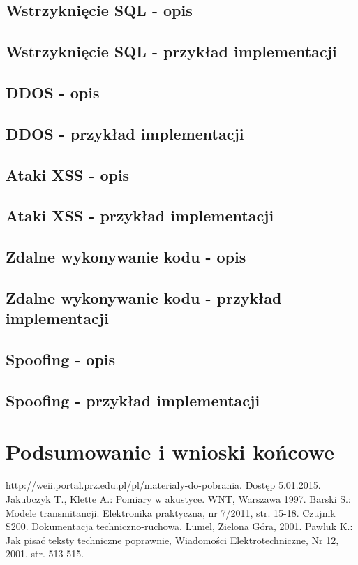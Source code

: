 \documentclass[12pt,twoside]{article}
\begin{document}
\subsection{Wstrzyknięcie SQL - opis}
\subsection{Wstrzyknięcie SQL - przykład implementacji}

\subsection{DDOS - opis}
\subsection{DDOS - przykład implementacji}

\subsection{Ataki XSS - opis}
\subsection{Ataki XSS - przykład implementacji}

\subsection{Zdalne wykonywanie kodu - opis}
\subsection{Zdalne wykonywanie kodu - przykład implementacji}

\subsection{Spoofing - opis}
\subsection{Spoofing - przykład implementacji}

\clearpage
\section{Podsumowanie i wnioski końcowe}



\clearpage


\begin{thebibliography}{4}
 http://weii.portal.prz.edu.pl/pl/materialy-do-pobrania. Dostęp 5.01.2015.
 Jakubczyk T., Klette A.: Pomiary w akustyce. WNT, Warszawa 1997.
 Barski S.: Modele transmitancji. Elektronika praktyczna, nr 7/2011, str. 15-18.
 Czujnik S200. Dokumentacja techniczno-ruchowa. Lumel, Zielona Góra, 2001.
 Pawluk K.: Jak pisać teksty techniczne poprawnie, Wiadomości Elektrotechniczne, Nr 12, 2001, str. 513-515.
\end{thebibliography}

\clearpage

\makesummary
\end{document}
